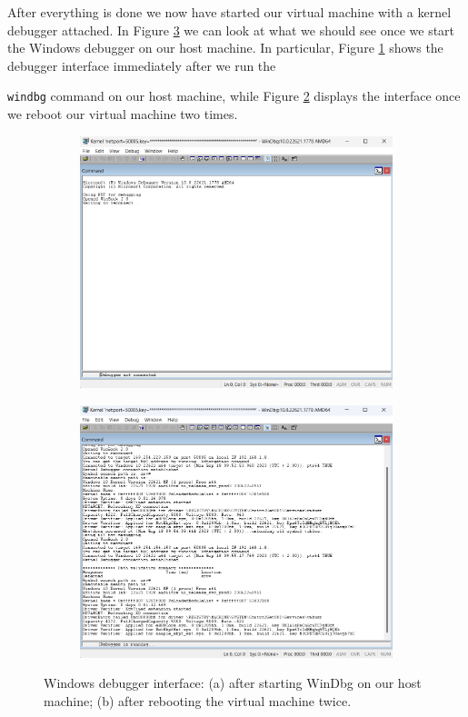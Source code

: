 After everything is done we now have started our virtual machine with a kernel debugger attached.
In Figure \ref{fig:WinDbg} we can look at what we should see once we start the Windows debugger on our host machine.
In particular, Figure \ref{fig:WinDbgNc} shows the debugger interface immediately after we run the \raggedright\colorbox{backcolour}{\lstinline[style=commandline, language=bash]|windbg|} command on our host machine, while Figure \ref{fig:WinDbgR} displays the interface once we reboot our virtual machine two times.

\begin{figure}[h]
	\centering
	\begin{subfigure}{.5\textwidth}
		\centering
		\includegraphics[width=0.7\linewidth]{images/WindowsDevelopment/WinDbg_nc.png}
		\caption{}
		\label{fig:WinDbgNc}
	\end{subfigure}%
	\begin{subfigure}{.5\textwidth}
		\centering
		\includegraphics[width=0.7\linewidth]{images/WindowsDevelopment/WinDbg_r.png}
		\caption{}
		\label{fig:WinDbgR}
	\end{subfigure}	
	\caption{Windows debugger interface: (a) after starting WinDbg on our host machine; (b) after rebooting the virtual machine twice.}
	\label{fig:WinDbg}
\end{figure}

